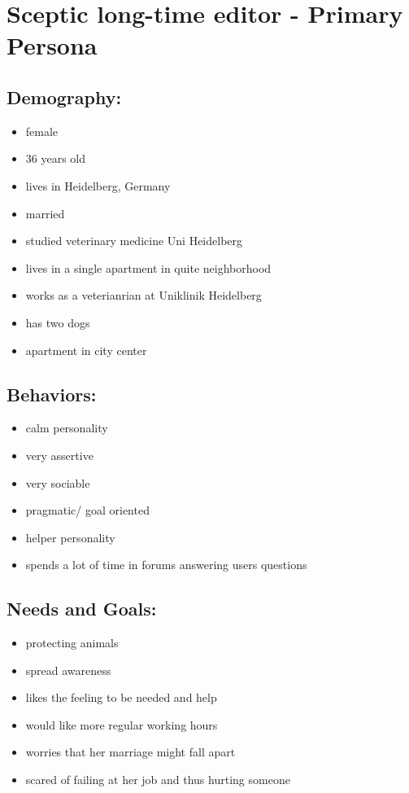 \documentclass{article}
\date{11.11.2015}
\begin{document}
\section{Sceptic long-time editor - Primary Persona}

\subsection{Demography:}
\begin{itemize}
 \item female
 \item 36 years old
 \item lives in Heidelberg, Germany
 \item married
 \item studied veterinary medicine Uni Heidelberg
 \item lives in a single apartment in quite neighborhood
 \item works as a veterianrian at Uniklinik Heidelberg
 \item has two dogs
 \item apartment in city center
\end{itemize}

\subsection{Behaviors:}
\begin{itemize}
\item calm personality
\item very assertive
\item very sociable
\item pragmatic/ goal oriented
\item helper personality
\item spends a lot of time in forums answering users questions
\end{itemize}

\subsection{Needs and Goals:}
\begin{itemize}
 \item protecting animals
 \item spread awareness
 \item likes the feeling to be needed and help
 \item would like more regular working hours
 \item worries that her marriage might fall apart
 \item scared of failing at her job and thus hurting someone
\end{itemize}
\end{document}
